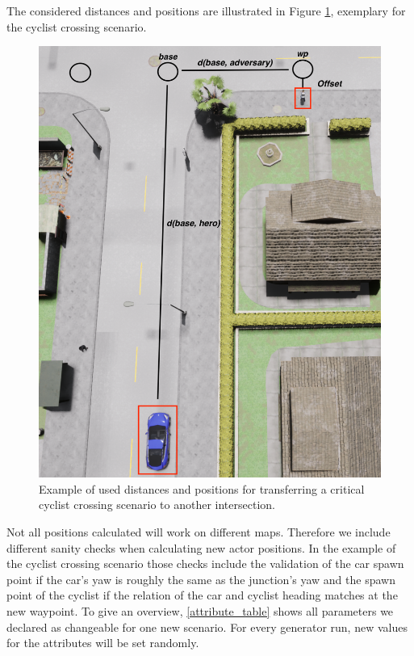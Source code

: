 \documentclass[conference, a4paper, 11pt]{IEEEtran}
\begin{document}
	
	The considered distances and positions are illustrated  in Figure \ref{fig:distances_carla}, exemplary for the cyclist crossing scenario.
	
	\begin{figure}[ht]
		\centering
		\includegraphics[width=\linewidth]{figures/carla_distances.png}
		\caption{Example of used distances and positions for transferring a critical cyclist crossing scenario to another intersection. }
		\label{fig:distances_carla}
	\end{figure}
	
	Not all positions calculated will work on different maps. Therefore we include different sanity checks when calculating new actor positions. In the example of the cyclist crossing scenario those checks include the validation of the car spawn point if the car's yaw is roughly the same as the junction's yaw and the spawn point of the cyclist  if the relation of the car and cyclist heading matches at the new waypoint.
	To give an overview, \autoref{attribute_table} shows all parameters we declared as changeable for one new scenario. For every generator run, new values for the attributes will be set randomly.
	
\end{document}
